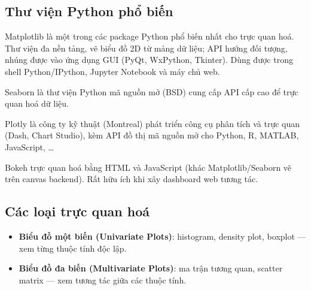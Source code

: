 \subsection{Thư viện Python phổ biến}

\begin{dinhnghia}[title={Matplotlib}]
Matplotlib là một trong các package Python phổ biến nhất cho trực quan hoá.
Thư viện đa nền tảng, vẽ biểu đồ 2D từ mảng dữ liệu; API hướng đối tượng, nhúng được vào ứng dụng GUI (PyQt, WxPython, Tkinter).
Dùng được trong shell Python/IPython, Jupyter Notebook và máy chủ web.
\end{dinhnghia}

\begin{dinhnghia}[title={Seaborn}]
Seaborn là thư viện Python mã nguồn mở (BSD) cung cấp API cấp cao để trực quan hoá dữ liệu.
\end{dinhnghia}

\begin{dinhnghia}[title={Plotly}]
Plotly là công ty kỹ thuật (Montreal) phát triển công cụ phân tích và trực quan (Dash, Chart Studio), kèm API đồ thị mã nguồn mở cho Python, R, MATLAB, JavaScript, \ldots
\end{dinhnghia}

\begin{dinhnghia}[title={Bokeh}]
Bokeh trực quan hoá bằng HTML và JavaScript (khác Matplotlib/Seaborn vẽ trên canvas backend).
Rất hữu ích khi xây dashboard web tương tác.
\end{dinhnghia}

\subsection{Các loại trực quan hoá}

\begin{phuongphap}[title={Phân loại}]
  \begin{itemize}
    \item \textbf{Biểu đồ một biến (Univariate Plots)}: histogram, density plot, boxplot --- xem từng thuộc tính độc lập.
    \item \textbf{Biểu đồ đa biến (Multivariate Plots)}: ma trận tương quan, scatter matrix --- xem tương tác giữa các thuộc tính.
  \end{itemize}
  \end{phuongphap}
  
  \begin{vidu}[title={Tổng quan kỹ thuật trực quan}]
  \end{vidu}


